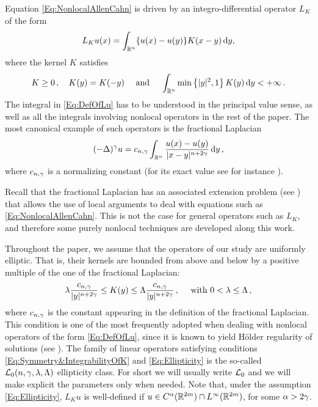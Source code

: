 Equation \eqref{Eq:NonlocalAllenCahn} is driven by an integro-differential operator $L_K$ of the form
\begin{equation}
\label{Eq:DefOfLu}
L_Ku(x) = \int_{\mathbb{R}^n} \{u(x) - u(y)\} K(x-y)\,\mathrm{d} y,
\end{equation}
where the kernel $K$ satisfies
\begin{equation}
\label{Eq:Symmetry&IntegrabilityOfK}
K\geq 0\,, \quad K(y) = K(-y) \quad \textrm{ and } \quad \int_{\mathbb{R}^n} \min \left\{ |y|^2, 1 \right\} K(y) \,\mathrm{d} y < + \infty\,.
\end{equation}
The integral in \eqref{Eq:DefOfLu} has to be understood in the principal value sense, as well as all the integrals involving nonlocal operators in the rest of the paper.
The most canonical example of such operators is the fractional Laplacian
$$
(-\Delta)^\gamma u = c_{n, \gamma} \int_{\mathbb{R}^n} \dfrac{u(x) - u(y)}{|x-y|^{n + 2\gamma}}\,\mathrm{d} y\,,
$$
where $c_{n, \gamma}$ is a normalizing constant (for its exact value see for instance \cite{HitchhikerGuide}).

Recall that the fractional Laplacian has an associated extension problem (see \cite{CaffarelliSilvestre}) that allows the use of local arguments to deal with equations such as \eqref{Eq:NonlocalAllenCahn}. This is not the case for general operators such as $L_K$, and therefore some purely nonlocal techniques are developed along this work. 

Throughout the paper, we assume that the operators of our study are uniformly elliptic. That is, their kernels are bounded from above and below by a positive multiple of the one of the fractional Laplacian:
\begin{equation}
\label{Eq:Ellipticity}
\lambda \dfrac{c_{n,\gamma}}{|y|^{n+2\gamma}} \leq K(y) \leq \Lambda\dfrac{c_{n,\gamma}}{|y|^{n+2\gamma}}\,, \quad \text{ with }  0< \lambda \leq \Lambda \,,
\end{equation}
where $c_{n,\gamma}$ is the constant appearing in the definition of the fractional Laplacian. This condition is one of the most frequently adopted when dealing with nonlocal operators of the form \eqref{Eq:DefOfLu}, since it is known to yield Hölder regularity of solutions (see \cite{RosOton-Survey,SerraC2s+alphaRegularity}). The family of linear operators satisfying conditions \eqref{Eq:Symmetry&IntegrabilityOfK} and \eqref{Eq:Ellipticity} is the so-called $\mathcal{L}_0(n,\gamma,\lambda, \Lambda)$ ellipticity class. For short we will usually write $\mathcal{L}_0$ and we will make explicit the parameters only when needed. Note that, under the assumption \eqref{Eq:Ellipticity}, $L_K u$ is well-defined if $u\in C^\alpha(\mathbb{R}^{2m})\cap L^\infty(\mathbb{R}^{2m})$, for some $\alpha > 2 \gamma$.

